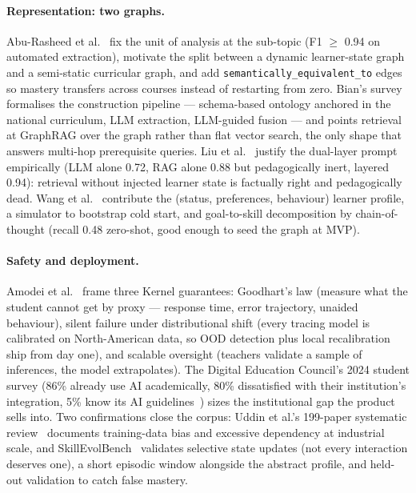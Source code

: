 \documentclass[11pt,a4paper]{article}
\begin{document}
\paragraph{Representation: two graphs.} Abu-Rasheed et
al.~\cite{aburasheed-2025} fix the unit of analysis at the sub-topic (F1
$\geq$ 0.94 on automated extraction), motivate the split between a dynamic
learner-state graph and a semi-static curricular graph, and add
\texttt{semantically\_equivalent\_to} edges so mastery transfers across
courses instead of restarting from zero. Bian's survey~\cite{bian-2025}
formalises the construction pipeline --- schema-based ontology anchored in
the national curriculum, LLM extraction, LLM-guided fusion --- and points
retrieval at GraphRAG over the graph rather than flat vector search, the only
shape that answers multi-hop prerequisite queries. Liu et
al.~\cite{lpitutor-2025} justify the dual-layer prompt empirically (LLM alone
0.72, RAG alone 0.88 but pedagogically inert, layered 0.94): retrieval
without injected learner state is factually right and pedagogically dead.
Wang et al.~\cite{genmentor-2025} contribute the (status, preferences,
behaviour) learner profile, a simulator to bootstrap cold start, and
goal-to-skill decomposition by chain-of-thought (recall 0.48 zero-shot, good
enough to seed the graph at MVP).

\paragraph{Safety and deployment.} Amodei et al.~\cite{amodei-2016} frame
three Kernel guarantees: Goodhart's law (measure what the student cannot get
by proxy --- response time, error trajectory, unaided behaviour), silent
failure under distributional shift (every tracing model is calibrated on
North-American data, so OOD detection plus local recalibration ship from day
one), and scalable oversight (teachers validate a sample of inferences, the
model extrapolates). The Digital Education Council's 2024 student survey (86\%
already use AI academically, 80\% dissatisfied with their institution's
integration, 5\% know its AI guidelines~\cite{dec-survey-2024}) sizes the
institutional gap the product sells into. Two confirmations close the corpus:
Uddin et al.'s 199-paper systematic review~\cite{uddin-2026} documents
training-data bias and excessive dependency at industrial scale, and
SkillEvolBench~\cite{skillevol-2026} validates selective state updates (not
every interaction deserves one), a short episodic window alongside the
abstract profile, and held-out validation to catch false mastery.
\end{document}
